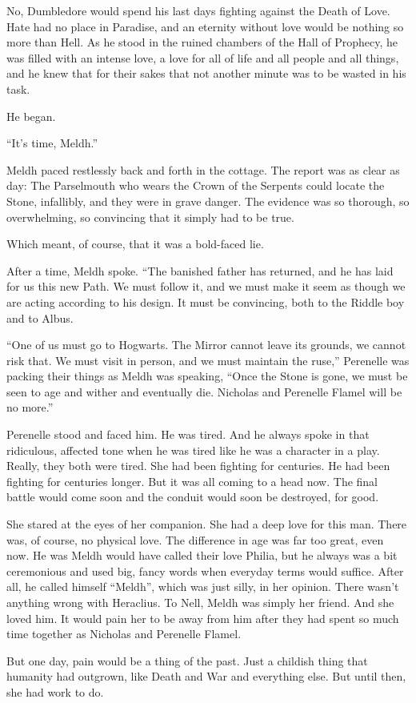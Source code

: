 No, Dumbledore would spend his last days fighting against the Death of Love. Hate had no place in Paradise, and an eternity without love would be nothing so more than Hell. As he stood in the ruined chambers of the Hall of Prophecy, he was filled with an intense love, a love for all of life and all people and all things, and he knew that for their sakes that not another minute was to be wasted in his task.

He began.
\simpleline


“It’s time, Meldh.”

Meldh paced restlessly back and forth in the cottage. The report was as clear as day: The Parselmouth who wears the Crown of the Serpents could locate the Stone, infallibly, and they were in grave danger. The evidence was so thorough, so overwhelming, so convincing that it simply had to be true.

Which meant, of course, that it was a bold-faced lie.

After a time, Meldh spoke. “The banished father has returned, and he has laid for us this new Path. We must follow it, and we must make it seem as though we are acting according to his design. It must be convincing, both to the Riddle boy and to Albus.

“One of us must go to Hogwarts. The Mirror cannot leave its grounds, we cannot risk that. We must visit in person, and we must maintain the ruse,” Perenelle was packing their things as Meldh was speaking, “Once the Stone is gone, we must be seen to age and wither and eventually die. Nicholas and Perenelle Flamel will be no more.”

Perenelle stood and faced him. He was tired. And he always spoke in that ridiculous, affected tone when he was tired like he was a character in a play. Really, they both were tired. She had been fighting for centuries. He had been fighting for centuries longer. But it was all coming to a head now. The final battle would come soon and the conduit would soon be destroyed, for good.

She stared at the eyes of her companion. She had a deep love for this man. There was, of course, no physical love. The difference in age was far too great, even now. He was Meldh would have called their love Philia, but he always was a bit ceremonious and used big, fancy words when everyday terms would suffice. After all, he called himself “Meldh”, which was just silly, in her opinion. There wasn’t anything wrong with Heraclius. To Nell, Meldh was simply her friend. And she loved him. It would pain her to be away from him after they had spent so much time together as Nicholas and Perenelle Flamel.

But one day, pain would be a thing of the past. Just a childish thing that humanity had outgrown, like Death and War and everything else. But until then, she had work to do.

